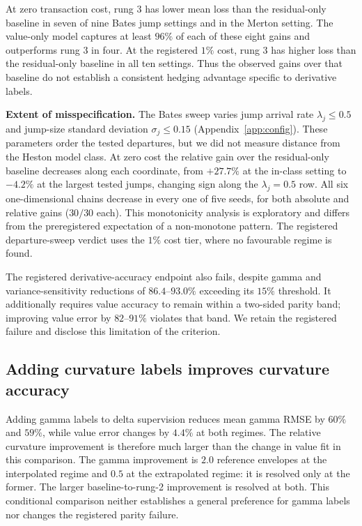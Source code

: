 \documentclass{article}
\begin{document}
At zero transaction cost, rung 3 has lower mean loss than the residual-only baseline
in seven of nine Bates jump settings and in the Merton setting. The value-only model
captures at least $96\%$ of each of these eight gains and outperforms rung 3 in four.
At the registered $1\%$ cost, rung 3 has higher loss than the residual-only baseline
in all ten settings. Thus the observed gains over that baseline do not establish a
consistent hedging advantage specific to derivative labels.

\textbf{Extent of misspecification.} The Bates sweep varies jump arrival rate
$\lambda_j\leq0.5$ and jump-size standard deviation $\sigma_j\leq0.15$
(Appendix~\ref{app:config}). These parameters order the tested departures, but we
did not measure distance from the Heston model class. At zero cost the relative gain
over the residual-only baseline decreases along each coordinate, from $+27.7\%$
at the in-class setting to $-4.2\%$ at the largest tested jumps, changing sign along
the $\lambda_j=0.5$ row. All six one-dimensional chains decrease in every one of
five seeds, for both absolute and relative gains ($30/30$ each). This monotonicity
analysis is exploratory and differs from the preregistered expectation of a
non-monotone pattern. The registered departure-sweep verdict uses the $1\%$ cost
tier, where no favourable regime is found.

The registered derivative-accuracy endpoint also fails, despite gamma and
variance-sensitivity reductions of $86.4$--$93.0\%$ exceeding its $15\%$ threshold.
It additionally requires value accuracy to remain within a two-sided parity band;
improving value error by $82$--$91\%$ violates that band. We retain the registered
failure and disclose this limitation of the criterion.

\subsection{Adding curvature labels improves curvature accuracy}
\label{sec:curvature}

Adding gamma labels to delta supervision reduces mean gamma RMSE by $60\%$ and
$59\%$, while value error changes by $4.4\%$ at both regimes. The relative
curvature improvement is therefore much larger than the change in value fit in
this comparison. The gamma improvement is $2.0$ reference envelopes at the
interpolated regime and $0.5$ at the extrapolated regime: it is resolved only at
the former. The larger baseline-to-rung-2 improvement is resolved at both. This
conditional comparison neither establishes a general preference for gamma labels
nor changes the registered parity failure.
\end{document}

